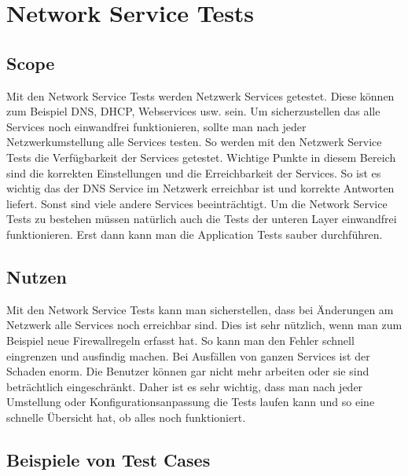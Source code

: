 \documentclass[a4,12pt]{scrartcl}
\begin{document}
\newpage
\section{Network Service Tests}
\subsection{Scope}
Mit den Network Service Tests werden Netzwerk Services getestet. Diese können zum Beispiel DNS, DHCP, Webservices usw. sein.
Um sicherzustellen das alle Services noch einwandfrei funktionieren, sollte man nach jeder Netzwerkumstellung alle Services testen. So werden mit den Netzwerk Service Tests die Verfügbarkeit der Services getestet.\newline\newline
Wichtige Punkte in diesem Bereich sind die korrekten Einstellungen und die Erreichbarkeit der Services. So ist es wichtig das der DNS Service im Netzwerk erreichbar ist und korrekte Antworten liefert. Sonst sind viele andere Services beeinträchtigt.\newline\newline
Um die Network Service Tests zu bestehen müssen natürlich auch die Tests der unteren Layer einwandfrei funktionieren. Erst dann kann man die Application Tests sauber durchführen.
\subsection{Nutzen}
Mit den Network Service Tests kann man sicherstellen, dass bei Änderungen am Netzwerk alle Services noch erreichbar sind. Dies ist sehr nützlich, wenn man zum Beispiel neue Firewallregeln erfasst hat. So kann man den Fehler schnell eingrenzen und ausfindig machen.\newline\newline
Bei Ausfällen von ganzen Services ist der Schaden enorm. Die Benutzer können gar nicht mehr arbeiten oder sie sind beträchtlich eingeschränkt. Daher ist es sehr wichtig, dass man nach jeder Umstellung oder Konfigurationsanpassung die Tests laufen kann und so eine schnelle Übersicht hat, ob alles noch funktioniert.

\subsection{Beispiele von Test Cases}
\end{document}
